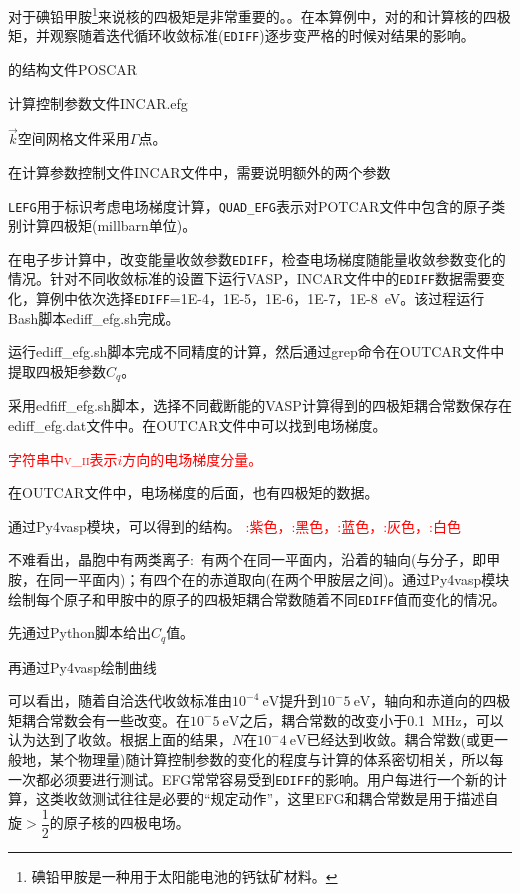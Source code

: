 对于碘铅甲胺\footnote{碘铅甲胺是一种用于太阳能电池的钙钛矿材料。}来说核的四极矩是非常重要的。。在本算例中，对的和计算核的四极矩，并观察随着迭代循环收敛标准(\texttt{EDIFF})逐步变严格的时候对结果的影响。

的结构文件\textrm{POSCAR}

计算控制参数文件\textrm{INCAR.efg}

$\vec k$空间网格文件采用$\Gamma$点。

在计算参数控制文件\textrm{INCAR}文件中，需要说明额外的两个参数

\texttt{LEFG}用于标识考虑电场梯度计算，\texttt{QUAD\_EFG}表示对\textrm{POTCAR}文件中包含的原子类别计算四极矩(\textrm{millbarn}单位)。

在电子步计算中，改变能量收敛参数\texttt{EDIFF}，检查电场梯度随能量收敛参数变化的情况。针对不同收敛标准的设置下运行\textrm{VASP}，\textrm{INCAR}文件中的\texttt{EDIFF}数据需要变化，算例中依次选择\texttt{EDIFF}=\textrm{1E-4}，\textrm{1E-5}，\textrm{1E-6}，\textrm{1E-7}，\textrm{1E-8~eV}。该过程运行\textrm{Bash}脚本\textrm{ediff\_efg.sh}完成。

运行\textrm{ediff\_efg.sh}脚本完成不同精度的计算，然后通过\textrm{grep}命令在\textrm{OUTCAR}文件中提取四极矩参数$C_q$。

采用\textrm{edfiff\_efg.sh}脚本，选择不同截断能的\textrm{VASP}计算得到的四极矩耦合常数保存在\textrm{ediff\_efg.dat}文件中。在\textrm{OUTCAR}文件中可以找到电场梯度。


\textcolor{red}{字符串中\textsc{v\_ii}表示$i$方向的电场梯度分量。}

在\textrm{OUTCAR}文件中，电场梯度的后面，也有四极矩的数据。

通过\textrm{Py4vasp}模块，可以得到的结构。
\textcolor{red}{:紫色，:黑色，:蓝色，:灰色，:白色}

不难看出，晶胞中有两类离子:~有两个在同一平面内，沿着的轴向(与分子，即甲胺，在同一平面内)；有四个在的赤道取向(在两个甲胺层之间)。通过\textrm{Py4vasp}模块绘制每个原子和甲胺中的原子的四极矩耦合常数随着不同\texttt{EDIFF}值而变化的情况。

先通过\textrm{Python}脚本给出$C_q$值。

再通过\textrm{Py4vasp}绘制曲线

可以看出，随着自洽迭代收敛标准由$10^{-4}~\mathrm{eV}$提升到$10^-5~\mathrm{eV}$，轴向和赤道向的四极矩耦合常数会有一些改变。在$10^-5~\mathrm{eV}$之后，耦合常数的改变小于\textrm{0.1~MHz}，可以认为达到了收敛。根据上面的结果，$N$在$10^-4~\mathrm{eV}$已经达到收敛。耦合常数(或更一般地，某个物理量)随计算控制参数的变化的程度与计算的体系密切相关，所以每一次都必须要进行测试。\textrm{EFG}常常容易受到\texttt{EDIFF}的影响。用户每进行一个新的计算，这类收敛测试往往是必要的``规定动作''，这里\textrm{EFG}和耦合常数是用于描述自旋$>\dfrac12$的原子核的四极电场。

